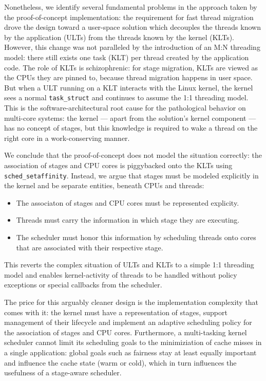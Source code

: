 \documentclass[12pt,a4paper]{article}
\begin{document}
Nonetheless, we identify several fundamental problems in the approach taken by the proof-of-concept implementation:
the requirement for fast thread migration drove the design toward a user-space solution which decouples the threads known by the application (ULTs) from the threads known by the kernel (KLTs).
However, this change was not paralleled by the introduction of an M:N threading model:
there still exists one task (KLT) per thread created by the application code.
The role of KLTs is schizophrenic: for stage migration, KLTs are viewed as the CPUs they are pinned to, because thread migration happens in user space.
But when a ULT running on a KLT interacts with the Linux kernel, the kernel sees a normal \texttt{task\_struct} and continues to assume the 1:1 threading model.
This is the software-architectural root cause for the pathological behavior on multi-core systems:
the kernel --- apart from the solution's kernel component --- has no concept of stages, but this knowledge is required to wake a thread on the right core in a work-conserving manner.

We conclude that the proof-of-concept does not model the situation correctly: the association of stages and CPU cores is piggybacked onto the KLTs using \texttt{sched\_setaffinity}.
Instead, we argue that stages must be modeled explicitly in the kernel and be separate entities, beneath CPUs and threads:
\begin{itemize}
    \item The associaton of stages and CPU cores must be represented explicity.
    \item Threads must carry the information in which stage they are executing.
    \item The scheduler must honor this information by scheduling threads onto cores that are associated with their respective stage.
\end{itemize}
This reverts the complex situation of ULTs and KLTs to a simple 1:1 threading model and enables kernel-activity of threads to be handled without policy exceptions or special callbacks from the scheduler.

The price for this arguably cleaner design is the implementation complexity that comes with it:
the kernel must have a representation of stages, support management of their lifecycle and implement an adaptive scheduling policy for the association of stages and CPU cores.
Furthermore, a multi-tasking kernel scheduler cannot limit its scheduling goals to the minimiziation of cache misses in a single application:
global goals such as fairness stay at least equally important and influence the cache state (warm or cold), which in turn influences the usefulness of a stage-aware scheduler.
\end{document}
